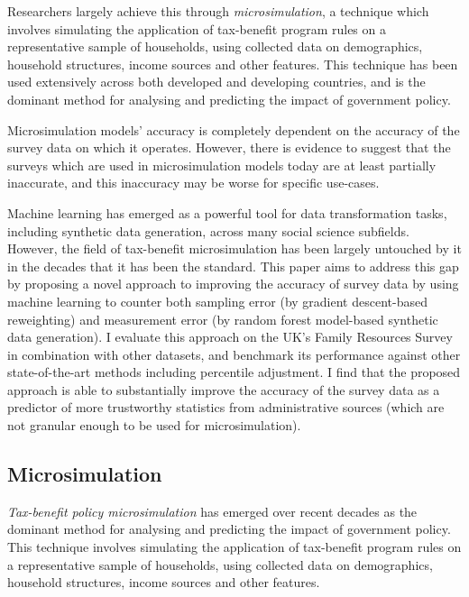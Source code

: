 \documentclass[10pt,journal,compsoc]{IEEEtran}
\begin{document}
Researchers largely achieve this through \emph{microsimulation}, a technique which involves simulating the application of tax-benefit program rules on a representative sample of households, using collected data on demographics, household structures, income sources and other features. This technique has been used extensively across both developed and developing countries, and is the dominant method for analysing and predicting the impact of government policy.

Microsimulation models' accuracy is completely dependent on the accuracy of the survey data on which it operates. However, there is evidence to suggest that the surveys which are used in microsimulation models today are at least partially inaccurate, and this inaccuracy may be worse for specific use-cases.

Machine learning has emerged as a powerful tool for data transformation tasks, including synthetic data generation, across many social science subfields. However, the field of tax-benefit microsimulation has been largely untouched by it in the decades that it has been the standard. This paper aims to address this gap by proposing a novel approach to improving the accuracy of survey data by using machine learning to counter both sampling error (by gradient descent-based reweighting) and measurement error (by random forest model-based synthetic data generation). I evaluate this approach on the UK's Family Resources Survey in combination with other datasets, and benchmark its performance against other state-of-the-art methods including percentile adjustment. I find that the proposed approach is able to substantially improve the accuracy of the survey data as a predictor of more trustworthy statistics from administrative sources (which are not granular enough to be used for microsimulation).

\subsection{Microsimulation}

\emph{Tax-benefit policy microsimulation} has emerged over recent decades as the dominant method for analysing and predicting the impact of government policy. This technique involves simulating the application of tax-benefit program rules on a representative sample of households, using collected data on demographics, household structures, income sources and other features.
\end{document}
